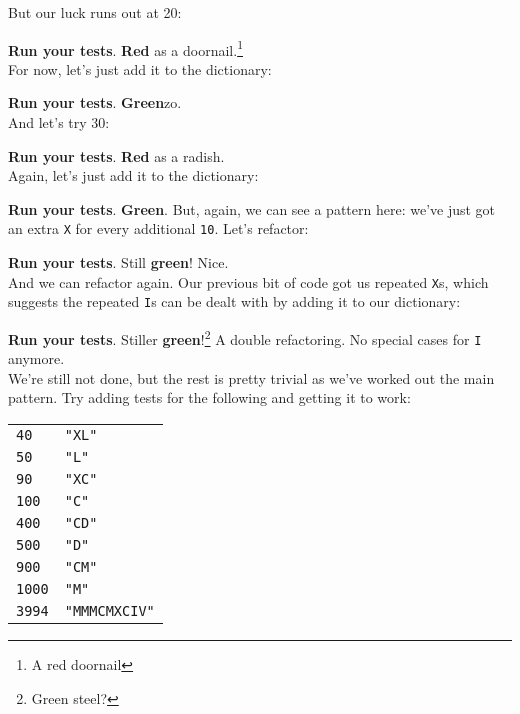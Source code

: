But our luck runs out at 20:



\textbf{Run your tests}. \textbf{Red} as a doornail.\footnote{A red doornail}
\\

For now, let's just add it to the dictionary:


\textbf{Run your tests}. \textbf{Green}zo.
\\

And let's try 30:



\textbf{Run your tests}. \textbf{Red} as a radish.
\\

Again, let's just add it to the dictionary:



\textbf{Run your tests}. \textbf{Green}. But, again, we can see a pattern here: we've just got an extra \texttt{X} for every additional \texttt{10}. Let's refactor:



\textbf{Run your tests}. Still \textbf{green}! Nice.
\\

And we can refactor again. Our previous bit of code got us repeated \texttt{X}s, which suggests the repeated \texttt{I}s can be dealt with by adding it to our dictionary:



\textbf{Run your tests}. Stiller \textbf{green}!\footnote{Green steel?} A double refactoring. No special cases for \texttt{I} anymore.
\\

We're still not done, but the rest is pretty trivial as we've worked out the main pattern. Try adding tests for the following and getting it to work:
\\

\begin{small}
    \begin{tabularx}{\textwidth}{l X}
        \texttt{40} & \texttt{"XL"} \\
        \texttt{50} & \texttt{"L"} \\
        \texttt{90} & \texttt{"XC"} \\
        \texttt{100} & \texttt{"C"} \\
        \texttt{400} & \texttt{"CD"} \\
        \texttt{500} & \texttt{"D"} \\
        \texttt{900} & \texttt{"CM"} \\
        \texttt{1000} & \texttt{"M"} \\
        \texttt{3994} & \texttt{"MMMCMXCIV"} \\
    \end{tabularx}
\end{small}

